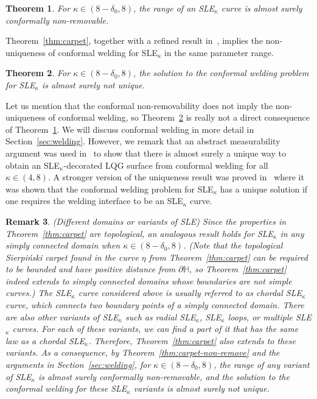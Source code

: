 \documentclass[a4paper]{article}
\numberwithin{equation}{section}
\newtheorem{theorem}{Theorem}[section]
\newtheorem{remark}[theorem]{Remark}
\numberwithin{equation}{section}
\renewcommand{\1}{\mathbf{1}}
\begin{document}
\begin{theorem}\label{thm:non-removable}
    For $\kappa \in (8 - \delta_0,8)$, the range of an SLE$_\kappa$ curve is almost surely conformally non-removable.
\end{theorem}

Theorem~\ref{thm:carpet}, together with a refined result in~\cite{Ntalampekos-carpet}, implies the non-uniqueness of conformal welding for SLE$_\kappa$ in the same parameter range.

\begin{theorem}\label{thm:welding}
    For $\kappa \in (8-\delta_0,8)$, the solution to the conformal welding problem for SLE$_\kappa$ is almost surely not unique.
\end{theorem}

Let us mention that the conformal non-removability does not imply the non-uniqueness of conformal welding, so Theorem~\ref{thm:welding} is really not a direct consequence of Theorem~\ref{thm:non-removable}. We will discuss conformal welding in more detail in Section~\ref{sec:welding}.
However, we remark that an abstract measurability argument was used in~\cite{DMS21-LQG-MRT} to show that there is almost surely a unique way to obtain an SLE$_\kappa$-decorated LQG surface from conformal welding for all $\kappa \in (4,8)$. A stronger version of the uniqueness result was proved in~\cite{MMQ-welding} where it was shown that the conformal welding problem for SLE$_\kappa$ has a unique solution if one requires the welding interface to be an SLE$_\kappa$ curve.

\begin{remark}(Different domains or variants of SLE)
    Since the properties in Theorem~\ref{thm:carpet} are topological, an analogous result holds for SLE$_\kappa$ in any simply connected domain when $\kappa \in (8 - \delta_0,8)$. (Note that the topological Sierpi\'nski carpet found in the curve $\eta$ from Theorem~\ref{thm:carpet} can be required to be bounded and have positive distance from $\partial \mathbb{H}$, so Theorem~\ref{thm:carpet} indeed extends to simply connected domains whose boundaries are not simple curves.) The SLE$_\kappa$ curve considered above is usually referred to as chordal SLE$_\kappa$ curve, which connects two boundary points of a simply connected domain. There are also other variants of SLE$_\kappa$ such as radial SLE$_\kappa$, SLE$_\kappa$ loops, or multiple SLE$_\kappa$ curves. For each of these variants, we can find a part of it that has the same law as a chordal SLE$_\kappa$. Therefore, Theorem~\ref{thm:carpet} also extends to these variants. As a consequence, by Theorem~\ref{thm:carpet-non-remove} and the arguments in Section~\ref{sec:welding}, for $\kappa \in (8 - \delta_0, 8)$, the range of any variant of SLE$_\kappa$ is almost surely conformally non-removable, and the solution to the conformal welding for these SLE$_\kappa$ variants is almost surely not unique.
\end{remark}
\end{document}
